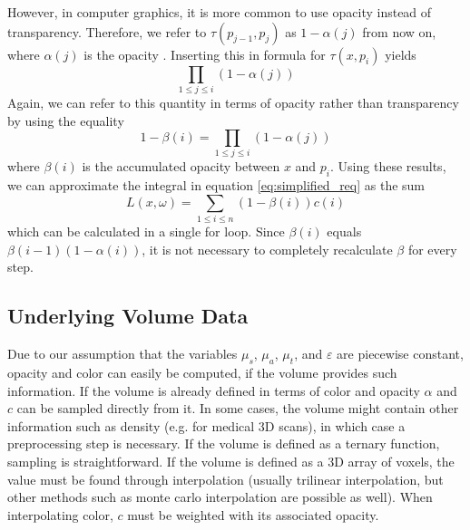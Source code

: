 However, in computer graphics, it is more common to use opacity instead of transparency. Therefore, we refer to $\tau(p_{j-1}, p_j)$ as $1 - \alpha(j)$ from now on, where $\alpha(j)$ is the opacity \cite{10.1145/147130.147155}. Inserting this in formula for $\tau({x}, p_i)$ yields 
\begin{equation} \label{eq:discrete_transmittance}
\prod_{1 \le j \le i} (1 - \alpha(j))
\end{equation}
Again, we can refer to this quantity in terms of opacity rather than transparency by using the equality
\begin{equation}
1 - \beta(i) = \prod_{1 \le j \le i} (1 - \alpha(j))
\end{equation}
where $\beta(i)$ is the accumulated opacity \cite{10.1145/147130.147155} between ${x}$ and $p_i$.
Using these results, we can approximate the integral in equation \ref{eq:simplified_req} as the sum
\begin{equation} \label{eq:discrete_approximation}
L({x},\omega) = \sum_{1 \le i \le n}(1 - \beta(i))c(i)
\end{equation}
which can be calculated in a single for loop\cite{10.1145/147130.147155}. Since $\beta(i)$ equals $\beta(i-1)(1-\alpha(i))$, it is not necessary to completely recalculate $\beta$ for every step.


\subsection{Underlying Volume Data}
Due to our assumption that the variables $\mu_s$, $\mu_a$, $\mu_t$, and $\varepsilon$ are piecewise constant, opacity and color can easily be computed, if the volume provides such information. If the volume is already defined in terms of color and opacity $\alpha$ and $c$ can be sampled directly from it.
In some cases, the volume might contain other information such as density (e.g. for medical 3D scans), in which case a preprocessing step\cite{511} is necessary.
If the volume is defined as a ternary function, sampling is straightforward. If the volume is defined as a 3D array of voxels, the value must be found through interpolation (usually trilinear interpolation\cite{511}, but other methods such as monte carlo interpolation\cite{10.1145/3451256} are possible as well).
When interpolating color, $c$ must be weighted with its associated opacity\cite{729595}.

